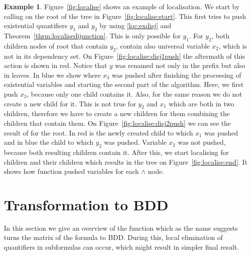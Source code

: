 \documentclass[
  digital, %
  color,
  twoside, %
  table,   %
  nolof,     %
  nolot,     %
]{fithesis3}
\theoremstyle{definition}
\newtheorem{example}{Example}
\theoremstyle{remark}
\begin{document}
\begin{example}
  \label{ex:QTlocalising}
  Figure~\ref{fig:localise} shows an example of localisation. We start by calling  on the root of the tree in Figure~\ref{fig:localise:start}. This first tries to push existential quantifiers $y_1$ and $y_2$ by using \eqref{loc:exdisj} and Theorem~\ref{thrm:localisedijunction}. This is only possible for $y_1$. For $y_2$, both children nodes of root that contain $y_2$, contain also universal variable $x_2$, which is not in its dependency set. On Figure~\ref{fig:localise:disj1push} the aftermath of this action is shown in red. Notice that $y$ was renamed not only in the prefix but also in leaves. In blue we show where $x_3$ was pushed after finishing the processing of existential variables and starting the second part of the algorithm. Here, we first push $x_3$, because only one child contains it. Also, for the same reason we do not create a new child for it. This is not true for $y_2$ and $x_1$ which are both in two children, therefore we have to create a new children for them combining the children that contain them. On Figure~\ref{fig:localise:disj2push} we can see the result of  for the root. In red is the newly created child to which $x_1$ was pushed and in blue the child to which $y_2$ was pushed. Variable $x_2$ was not pushed, because both resulting children contain it. After this, we start localising for children and their children which results in the tree on Figure~\ref{fig:localise:end}. It shows how function  pushed variables for each ${\land}$ node.
\end{example}

\section{Transformation to BDD}
\label{sec:algturntobdd}
In this section we give an overview of the function  which as the name suggests turns the matrix of the formula to BDD. During this, local elimination of quantifiers in subformulas can occur, which might result in simpler final result. 
\end{document}
